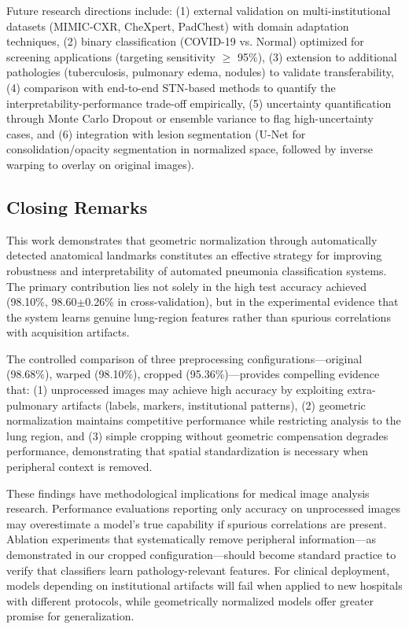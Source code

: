 \documentclass[applsci,article,submit,pdftex,moreauthors]{Definitions/mdpi}
\begin{document}
Future research directions include: (1) external validation on multi-institutional datasets (MIMIC-CXR, CheXpert, PadChest) with domain adaptation techniques, (2) binary classification (COVID-19 vs. Normal) optimized for screening applications (targeting sensitivity $\geq$ 95\%), (3) extension to additional pathologies (tuberculosis, pulmonary edema, nodules) to validate transferability, (4) comparison with end-to-end STN-based methods to quantify the interpretability-performance trade-off empirically, (5) uncertainty quantification through Monte Carlo Dropout or ensemble variance to flag high-uncertainty cases, and (6) integration with lesion segmentation (U-Net for consolidation/opacity segmentation in normalized space, followed by inverse warping to overlay on original images).

\subsection{Closing Remarks}

This work demonstrates that geometric normalization through automatically detected anatomical landmarks constitutes an effective strategy for improving robustness and interpretability of automated pneumonia classification systems. The primary contribution lies not solely in the high test accuracy achieved (98.10\%, 98.60$\pm$0.26\% in cross-validation), but in the experimental evidence that the system learns genuine lung-region features rather than spurious correlations with acquisition artifacts.

The controlled comparison of three preprocessing configurations---original (98.68\%), warped (98.10\%), cropped (95.36\%)---provides compelling evidence that: (1) unprocessed images may achieve high accuracy by exploiting extra-pulmonary artifacts (labels, markers, institutional patterns), (2) geometric normalization maintains competitive performance while restricting analysis to the lung region, and (3) simple cropping without geometric compensation degrades performance, demonstrating that spatial standardization is necessary when peripheral context is removed.

These findings have methodological implications for medical image analysis research. Performance evaluations reporting only accuracy on unprocessed images may overestimate a model's true capability if spurious correlations are present. Ablation experiments that systematically remove peripheral information---as demonstrated in our cropped configuration---should become standard practice to verify that classifiers learn pathology-relevant features. For clinical deployment, models depending on institutional artifacts will fail when applied to new hospitals with different protocols, while geometrically normalized models offer greater promise for generalization.
\end{document}
